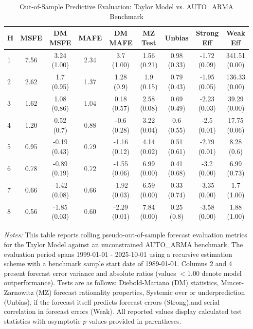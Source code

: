 \begin{table}[htbp]
\centering
\caption{Out-of-Sample Predictive Evaluation: Taylor Model vs. AUTO_ARMA Benchmark}
\label{tab:taylor_model_evaluation}
\footnotesize
\begin{tabular}{l cccccccc}
\hline\hline
\rule{0pt}{3ex}
\textbf{H} & \textbf{MSFE} & \textbf{DM MSFE} & \textbf{MAFE} & \textbf{DM MAFE} & \textbf{MZ Test} & \textbf{Unbias} & \textbf{Strong Eff} & \textbf{Weak Eff} \\[0.5ex]
\hline
\rule{0pt}{2.5ex}
1 & 7.56 & 3.24 (1.00) & 2.34 & 3.7 (1.00) & 1.56 (0.21) & 0.98 (0.33) & -1.72 (0.09) & 341.51 (0.00) \\
2 & 2.62 & 1.7 (0.95) & 1.37 & 1.28 (0.9) & 1.9 (0.15) & 0.79 (0.43) & -1.95 (0.05) & 136.33 (0.00) \\
3 & 1.62 & 1.08 (0.86) & 1.04 & 0.18 (0.57) & 2.58 (0.08) & 0.69 (0.49) & -2.23 (0.03) & 39.29 (0.00) \\
4 & 1.20 & 0.52 (0.7) & 0.88 & -0.6 (0.28) & 3.22 (0.04) & 0.6 (0.55) & -2.5 (0.01) & 17.75 (0.06) \\
5 & 0.95 & -0.19 (0.43) & 0.79 & -1.16 (0.12) & 4.14 (0.02) & 0.51 (0.61) & -2.79 (0.01) & 8.28 (0.6) \\
6 & 0.78 & -0.89 (0.19) & 0.72 & -1.55 (0.06) & 6.99 (0.00) & 0.41 (0.68) & -3.2 (0.00) & 6.99 (0.73) \\
7 & 0.66 & -1.42 (0.08) & 0.66 & -1.92 (0.03) & 6.59 (0.00) & 0.33 (0.74) & -3.35 (0.00) & 1.7 (1.00) \\
8 & 0.56 & -1.85 (0.03) & 0.60 & -2.29 (0.01) & 7.84 (0.00) & 0.25 (0.8) & -3.58 (0.00) & 1.88 (1.00) \\
\hline\hline
\end{tabular}%
\par\smallskip
\parbox{\textwidth}{\scriptsize \textit{Notes:} This table reports rolling pseudo-out-of-sample forecast evaluation metrics for the Taylor Model against an unconstrained AUTO_ARMA benchmark. The evaluation period spans 1999-01-01 - 2025-10-01 using a recursive estimation scheme with a benchmark sample start date of 1989-01-01. Columns 2 and 4 present forecast error variance and absolute ratios (values $< 1.00$ denote model outperformance). Tests are as follows: Diebold-Mariano (DM) statistics, Mincer-Zarnowitz (MZ) forecast rationality properties, Systemic over or underprediction (Unbias), if the forecast itself predicts forecast errors (Strong),and serial correlation in forecast errors (Weak). All reported values display calculated test statistics with asymptotic $p$-values provided in parentheses.}
\end{table}
